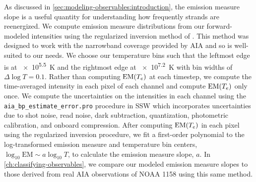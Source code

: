 As discussed in \autoref{sec:modeling-observables:introduction}, the emission measure slope is a useful quantity for understanding how frequently strands are reenergized. We compute emission measure distributions from our forward-modeled intensities using the regularized inversion method of \citet{hannah_differential_2012}. This method was designed to work with the narrowband coverage provided by AIA and so is well-suited to our needs. We choose our temperature bins such that the leftmost edge is at \SI{e5.5}{\kelvin} and the rightmost edge at \SI{e7.2}{\kelvin} with bin widths of $\Delta\log T=0.1$. Rather than computing $\textup{EM}(T_e)$ at each timestep, we compute the time-averaged intensity in each pixel of each channel and compute $\textup{EM}(T_e)$ only once. We compute the uncertainties on the intensities in each channel using the \texttt{aia\_bp\_estimate\_error.pro} procedure in SSW which incorporates uncertainties due to shot noise, read noise, dark subtraction, quantization, photometric calibration, and onboard compression. After computing $\textup{EM}(T_e)$ in each pixel using the regularized inversion procedure, we fit a first-order polynomial to the log-transformed emission measure and temperature bin centers, $\log_{10}\mathrm{EM}\sim a\log_{10}T$, to calculate the emission measure slope, $a$. In \autoref{ch:classifying-observables}, we compare our modeled emission measure slopes to those derived from real AIA observations of NOAA 1158 using this same method.

